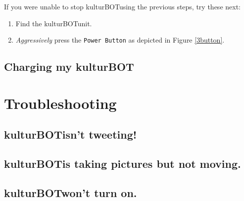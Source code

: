 \documentclass[]{article}
\newcommand{\kb}{kulturBOT}
\newcommand{\kbspace}{\kb \space}
\newcommand{\mykb}{my \kb}
\begin{document}
If you were unable to stop \kbspace using the previous steps, try these next:

\begin{enumerate}
\item Find the \kbspace unit.
\item \textit{Aggressively} press the \texttt{Power Button} as depicted in Figure \ref{3button}.
\end{enumerate}

\subsection{Charging \mykb}
\label{chargingKB}

\section{Troubleshooting}
\subsection{\kbspace isn't tweeting!}
\label{kbNoTweet}

\subsection{\kbspace is taking pictures but not moving.}
\subsection{\kbspace won't turn on.}
\end{document}
